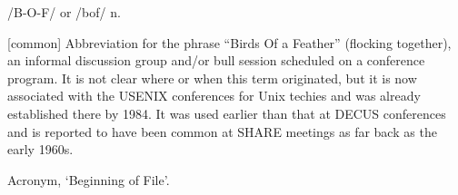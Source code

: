  /B-O-F/ or /bof/ n.

\begin{inparaenum}
\item {[}common] Abbreviation for the phrase ``Birds Of a Feather'' (flocking
    together), an informal discussion group and/or bull session scheduled on a
    conference program. It is not clear where or when this term originated, but
    it is now associated with the USENIX conferences for Unix techies and was
    already established there by 1984. It was used earlier than that at DECUS
    conferences and is reported to have been common at SHARE meetings as far
    back as the early 1960s.
\item Acronym, `Beginning of File'.
\end{inparaenum}

